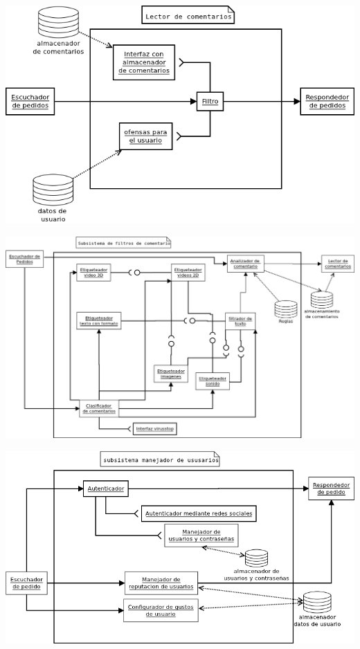 \begin{center}
\includegraphics[scale=0.45]{../img/lectura.png}\\
\end{center}
\begin{center}
\includegraphics[scale=0.45]{../img/filtros.png}\\
\end{center}
\begin{center}
\includegraphics[scale=0.5]{../img/autenticador.png}\\
\end{center}

